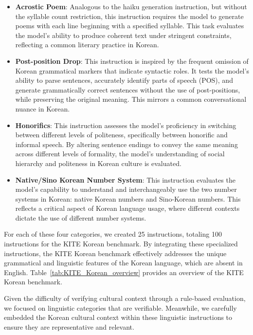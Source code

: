     \begin{itemize}
    \item \textbf{Acrostic Poem}: Analogous to the haiku generation instruction, but without the syllable count restriction, this instruction requires the model to generate poems with each line beginning with a specified syllable. This task evaluates the model's ability to produce coherent text under stringent constraints, reflecting a common literary practice in Korean.
    \item \textbf{Post-position Drop}: This instruction is inspired by the frequent omission of Korean grammatical markers that indicate syntactic roles. It tests the model's ability to parse sentences, accurately identify parts of speech (POS), and generate grammatically correct sentences without the use of post-positions, while preserving the original meaning. This mirrors a common conversational nuance in Korean.
    \item \textbf{Honorifics}: This instruction assesses the model's proficiency in switching between different levels of politeness, specifically between honorific and informal speech. By altering sentence endings to convey the same meaning across different levels of formality, the model's understanding of social hierarchy and politeness in Korean culture is evaluated.
    \item \textbf{Native/Sino Korean Number System}: This instruction evaluates the model's capability to understand and interchangeably use the two number systems in Korean: native Korean numbers and Sino-Korean numbers. This reflects a critical aspect of Korean language usage, where different contexts dictate the use of different number systems.
    \end{itemize}

    For each of these four categories, we created 25 instructions, totaling 100 instructions for the KITE Korean benchmark. By integrating these specialized instructions, the KITE Korean benchmark effectively addresses the unique grammatical and linguistic features of the Korean language, which are absent in English. Table~\ref{tab:KITE_Korean_overview} provides an overview of the KITE Korean benchmark.

    Given the difficulty of verifying cultural context through a rule-based evaluation, we focused on linguistic categories that are verifiable. Meanwhile, we carefully embedded the Korean cultural context within these linguistic instructions to ensure they are representative and relevant.

